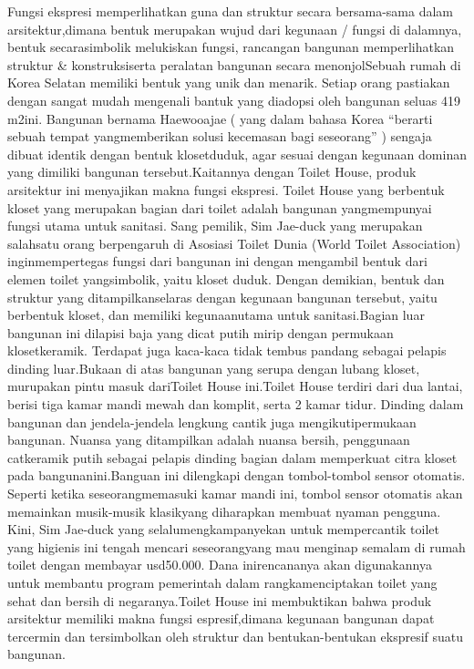 \documentclass[../manperil.tex]{subfiles}
\begin{document}
Fungsi ekspresi memperlihatkan guna dan struktur secara bersama-sama dalam arsitektur,dimana bentuk merupakan wujud dari kegunaan / fungsi di dalamnya, bentuk secarasimbolik melukiskan fungsi, rancangan bangunan memperlihatkan struktur \& konstruksiserta peralatan bangunan secara menonjolSebuah rumah di Korea Selatan memiliki bentuk yang unik dan menarik. Setiap orang pastiakan dengan sangat mudah mengenali bantuk yang diadopsi oleh bangunan seluas 419 m2ini. Bangunan bernama Haewooajae ( yang dalam bahasa Korea “berarti sebuah tempat yangmemberikan solusi kecemasan bagi seseorang” ) sengaja dibuat identik dengan bentuk klosetduduk, agar sesuai dengan kegunaan dominan yang dimiliki bangunan tersebut.Kaitannya dengan Toilet House, produk arsitektur ini menyajikan makna fungsi ekspresi. Toilet House yang berbentuk kloset yang merupakan bagian dari toilet adalah bangunan yangmempunyai fungsi utama untuk sanitasi. Sang pemilik, Sim Jae-duck yang merupakan salahsatu orang berpengaruh di Asosiasi Toilet Dunia (World Toilet Association) inginmempertegas fungsi dari bangunan ini dengan mengambil bentuk dari elemen toilet yangsimbolik, yaitu kloset duduk. Dengan demikian, bentuk dan struktur yang ditampilkanselaras dengan kegunaan bangunan tersebut, yaitu berbentuk kloset, dan memiliki kegunaanutama untuk sanitasi.Bagian luar bangunan ini dilapisi baja yang dicat putih mirip dengan permukaan klosetkeramik. Terdapat juga kaca-kaca tidak tembus pandang sebagai pelapis dinding luar.Bukaan di atas bangunan yang serupa dengan lubang kloset, murupakan pintu masuk dariToilet House ini.Toilet House terdiri dari dua lantai, berisi tiga kamar mandi mewah dan komplit, serta 2 kamar tidur. Dinding dalam bangunan dan jendela-jendela lengkung cantik juga mengikutipermukaan bangunan. Nuansa yang ditampilkan adalah nuansa bersih, penggunaan catkeramik putih sebagai pelapis dinding bagian dalam memperkuat citra kloset pada bangunanini.Banguan ini dilengkapi dengan tombol-tombol sensor otomatis. Seperti ketika seseorangmemasuki kamar mandi ini, tombol sensor otomatis akan memainkan musik-musik klasikyang diharapkan membuat nyaman pengguna. Kini, Sim Jae-duck yang selalumengkampanyekan untuk mempercantik toilet yang higienis ini tengah mencari seseorangyang mau menginap semalam di rumah toilet dengan membayar usd50.000. Dana inirencananya akan digunakannya untuk membantu program pemerintah dalam rangkamenciptakan toilet yang sehat dan bersih di negaranya.Toilet House ini membuktikan bahwa produk arsitektur memiliki makna fungsi espresif,dimana kegunaan bangunan dapat tercermin dan tersimbolkan oleh struktur dan bentukan-bentukan ekspresif suatu bangunan.
\end{document}
